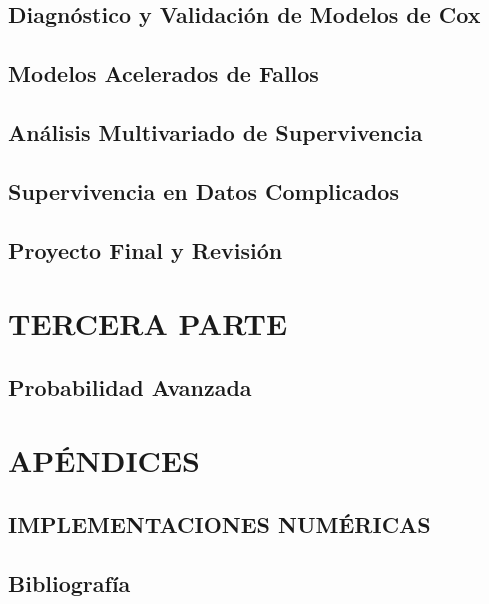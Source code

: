 \documentclass{report}
\begin{document}
\chapter{Diagn\'ostico y Validaci\'on de Modelos de Cox}


\chapter{Modelos Acelerados de Fallos}


\chapter{An\'alisis Multivariado de Supervivencia}


\chapter{Supervivencia en Datos Complicados}


\chapter{Proyecto Final y Revisi\'on}


\part{TERCERA PARTE}
\chapter{Probabilidad Avanzada}



\part{APÉNDICES}
\chapter{IMPLEMENTACIONES NUM\'ERICAS}





\chapter{Bibliografía}

\end{document}
